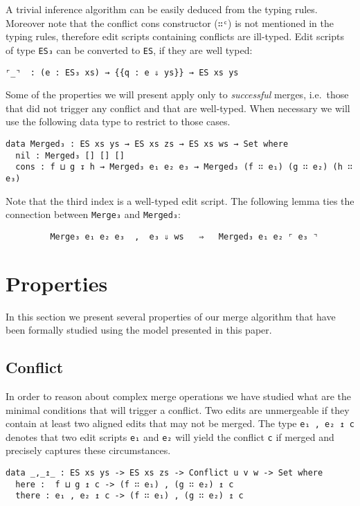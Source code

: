 \documentclass[preprint]{sigplanconf}
\begin{document}
	A trivial inference algorithm can be easily deduced from the typing rules.
	Moreover note that the conflict cons constructor (\texttt{∷ᶜ}) is not 
	mentioned in the typing rules, therefore edit scripts containing
	conflicts are ill-typed.		
	Edit scripts of type \texttt{ES₃} can be converted to \texttt{ES}, if they
	are well typed:
\begin{verbatim}
⌜_⌝  : (e : ES₃ xs) → {{q : e ⇓ ys}} → ES xs ys
\end{verbatim}

        Some of the properties we will present apply only to \emph{successful} 
        merges, i.e.\ those that did not trigger any conflict and that are 
        well-typed. When necessary we will use the following data type to restrict
        to those cases.

\begin{verbatim}
data Merged₃ : ES xs ys → ES xs zs → ES xs ws → Set where  
  nil : Merged₃ [] [] []
  cons : f ⊔ g ↧ h → Merged₃ e₁ e₂ e₃ → Merged₃ (f ∷ e₁) (g ∷ e₂) (h ∷ e₃)
\end{verbatim}
        Note that the third index is a well-typed edit script.
        The following lemma ties the connection between \texttt{Merge₃} and 
        \texttt{Merged₃}:
\begin{verbatim}
         Merge₃ e₁ e₂ e₃  ,  e₃ ⇓ ws   ⇒   Merged₃ e₁ e₂ ⌜ e₃ ⌝
\end{verbatim}

\section{Properties}
In this section we present several properties of our merge algorithm 
that have been formally studied using the model presented in this paper.

    \subsection{Conflict}  
    In order to reason about complex merge operations we have studied what are the 
    minimal conditions that will trigger a conflict.
    Two edits are unmergeable if they contain at least two aligned edits that 
    may not be merged.
    The type \texttt{e₁ , e₂  ↥ c} denotes that two edit scripts \texttt{e₁} and 
    \texttt{e₂} will yield the conflict \texttt{c} if merged and precisely
    captures these circumstances.

\begin{verbatim}
data _,_↥_ : ES xs ys -> ES xs zs -> Conflict u v w -> Set where
  here :  f ⊔ g ↥ c -> (f ∷ e₁) , (g ∷ e₂) ↥ c
  there : e₁ , e₂ ↥ c -> (f ∷ e₁) , (g ∷ e₂) ↥ c
\end{verbatim}
\end{document}
